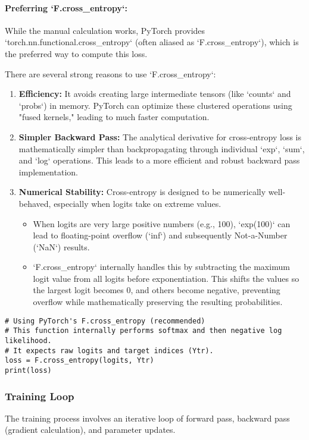 \paragraph{Preferring `F.cross_entropy`:}
While the manual calculation works, PyTorch provides `torch.nn.functional.cross_entropy` (often aliased as `F.cross_entropy`), which is the preferred way to compute this loss.

There are several strong reasons to use `F.cross_entropy`:
\begin{enumerate}
    \item \textbf{Efficiency:} It avoids creating large intermediate tensors (like `counts` and `probs`) in memory. PyTorch can optimize these clustered operations using "fused kernels," leading to much faster computation.
    \item \textbf{Simpler Backward Pass:} The analytical derivative for cross-entropy loss is mathematically simpler than backpropagating through individual `exp`, `sum`, and `log` operations. This leads to a more efficient and robust backward pass implementation.
    \item \textbf{Numerical Stability:} Cross-entropy is designed to be numerically well-behaved, especially when logits take on extreme values.
    \begin{itemize}
        \item When logits are very large positive numbers (e.g., 100), `exp(100)` can lead to floating-point overflow (`inf`) and subsequently Not-a-Number (`NaN`) results.
        \item `F.cross_entropy` internally handles this by subtracting the maximum logit value from all logits before exponentiation. This shifts the values so the largest logit becomes 0, and others become negative, preventing overflow while mathematically preserving the resulting probabilities.
    \end{itemize}
\end{enumerate}

\begin{lstlisting}[caption=Loss Calculation with F.cross_entropy]
# Using PyTorch's F.cross_entropy (recommended)
# This function internally performs softmax and then negative log likelihood.
# It expects raw logits and target indices (Ytr).
loss = F.cross_entropy(logits, Ytr)
print(loss)
\end{lstlisting}

\subsubsection{Training Loop}
The training process involves an iterative loop of forward pass, backward pass (gradient calculation), and parameter updates.

